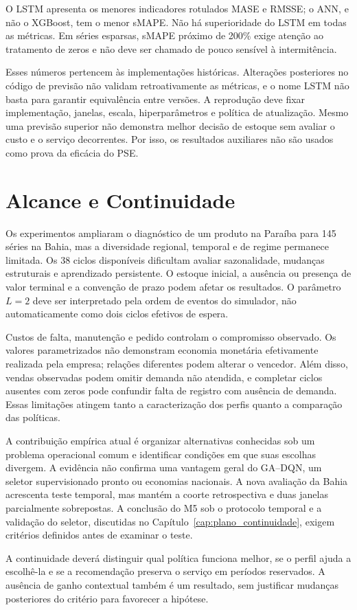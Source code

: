 O LSTM apresenta os menores indicadores rotulados MASE e RMSSE; o ANN, e não o XGBoost, tem o menor sMAPE. Não há superioridade do LSTM em todas as métricas. Em séries esparsas, sMAPE próximo de 200\% exige atenção ao tratamento de zeros e não deve ser chamado de pouco sensível à intermitência.

Esses números pertencem às implementações históricas. Alterações posteriores no código de previsão não validam retroativamente as métricas, e o nome LSTM não basta para garantir equivalência entre versões. A reprodução deve fixar implementação, janelas, escala, hiperparâmetros e política de atualização. Mesmo uma previsão superior não demonstra melhor decisão de estoque sem avaliar o custo e o serviço decorrentes. Por isso, os resultados auxiliares não são usados como prova da eficácia do PSE.

\section{Alcance e Continuidade}
\label{sec:threats}

Os experimentos ampliaram o diagnóstico de um produto na Paraíba para 145 séries na Bahia, mas a diversidade regional, temporal e de regime permanece limitada. Os 38 ciclos disponíveis dificultam avaliar sazonalidade, mudanças estruturais e aprendizado persistente. O estoque inicial, a ausência ou presença de valor terminal e a convenção de prazo podem afetar os resultados. O parâmetro $L=2$ deve ser interpretado pela ordem de eventos do simulador, não automaticamente como dois ciclos efetivos de espera.

Custos de falta, manutenção e pedido controlam o compromisso observado. Os valores parametrizados não demonstram economia monetária efetivamente realizada pela empresa; relações diferentes podem alterar o vencedor. Além disso, vendas observadas podem omitir demanda não atendida, e completar ciclos ausentes com zeros pode confundir falta de registro com ausência de demanda. Essas limitações atingem tanto a caracterização dos perfis quanto a comparação das políticas.

A contribuição empírica atual é organizar alternativas conhecidas sob um problema operacional comum e identificar condições em que suas escolhas divergem. A evidência não confirma uma vantagem geral do GA--DQN, um seletor supervisionado pronto ou economias nacionais. A nova avaliação da Bahia acrescenta teste temporal, mas mantém a coorte retrospectiva e duas janelas parcialmente sobrepostas. A conclusão do M5 sob o protocolo temporal e a validação do seletor, discutidas no Capítulo~\ref{cap:plano_continuidade}, exigem critérios definidos antes de examinar o teste.

A continuidade deverá distinguir qual política funciona melhor, se o perfil ajuda a escolhê-la e se a recomendação preserva o serviço em períodos reservados. A ausência de ganho contextual também é um resultado, sem justificar mudanças posteriores do critério para favorecer a hipótese.
